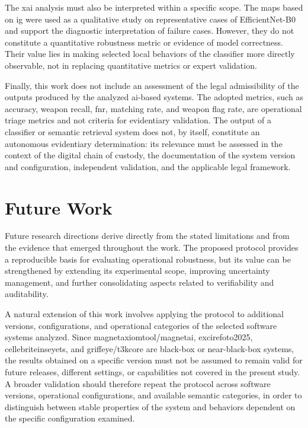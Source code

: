 The \gls{xai} analysis must also be interpreted within a specific scope. The
maps based on \gls{ig} were used as a qualitative study on representative cases
of EfficientNet-B0 and support the diagnostic interpretation of failure cases.
However, they do not constitute a quantitative robustness metric or evidence of
model correctness. Their value lies in making selected local behaviors of the
classifier more directly observable, not in replacing quantitative metrics or
expert validation.

Finally, this work does not include an assessment of the legal admissibility of
the outputs produced by the analyzed \gls{ai}-based systems. The adopted
metrics, such as accuracy, weapon recall, \gls{fnr}, matching rate, and weapon
flag rate, are operational triage metrics and not criteria for evidentiary
validation. The output of a classifier or semantic retrieval system does not, by
itself, constitute an autonomous evidentiary determination: its relevance must
be assessed in the context of the digital chain of custody, the documentation
of the system version and configuration, independent validation, and the
applicable legal framework.

\section{Future Work}
\label{sec:conclusions-future-work}

Future research directions derive directly from the stated limitations and from
the evidence that emerged throughout the work. The proposed protocol provides a
reproducible basis for evaluating operational robustness, but its value can be
strengthened by extending its experimental scope, improving uncertainty
management, and further consolidating aspects related to verifiability and
auditability.

A natural extension of this work involves applying the protocol to additional
versions, configurations, and operational categories of the selected software
systems analyzed. Since \gls{magnetaxiomtool}/\gls{magnetai},
\gls{excirefoto2025}, \gls{cellebriteinseyets}, and
\gls{griffeye}/\gls{t3kcore} are black-box or near-black-box systems, the
results obtained on a specific version must not be assumed to remain valid for
future releases, different settings, or capabilities not covered in the present
study. A broader validation should therefore repeat the protocol across
software versions, operational configurations, and available semantic
categories, in order to distinguish between stable properties of the system and
behaviors dependent on the specific configuration examined.

